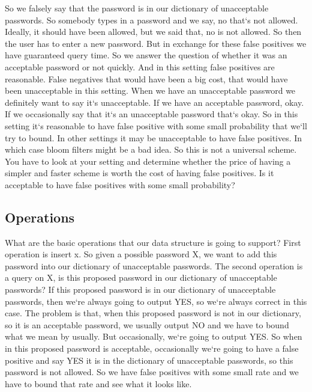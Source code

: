 So we falsely say that the password is in our dictionary of unacceptable passwords.
So somebody types in a password and we say, no that`s not allowed.
Ideally, it should have been allowed, but we said that, no is not allowed.
So then the user has to enter a new password.
But in exchange for these false positives we have guaranteed query time.
So we answer the question of whether it was an acceptable password or not quickly.
And in this setting false positives are reasonable.
False negatives that would have been a big cost, that would have been unacceptable in this setting.
When we have an unacceptable password we definitely want to say it`s unacceptable.
If we have an acceptable password, okay.
If we occasionally say that it`s an unacceptable password that`s okay.
So in this setting it`s reasonable to have false positive with some small probability that we`ll try to bound.
In other settings it may be unacceptable to have false positives.
In which case bloom filters might be a bad idea.
So this is not a universal scheme.
You have to look at your setting and determine whether the price of having a simpler and faster scheme is worth the cost of having false positives.
Is it acceptable to have false positives with some small probability?

\subsection{Operations}
What are the basic operations that our data structure is going to support? First operation is insert x.
So given a possible password X, we want to add this password into our dictionary of unacceptable passwords.
The second operation is a query on X, is this proposed password in our dictionary of unacceptable passwords? If this proposed password is in our dictionary of unacceptable passwords, then we`re always going to output YES, so we`re always correct in this case.
The problem is that, when this proposed password is not in our dictionary, so it is an acceptable password, we usually output NO and we have to bound what we mean by usually.
But occasionally, we`re going to output YES\@.
So when in this proposed password is acceptable, occasionally we`re going to have a false positive and say YES it is in the dictionary of unacceptable passwords, so this password is not allowed.
So we have false positives with some small rate and we have to bound that rate and see what it looks like.


